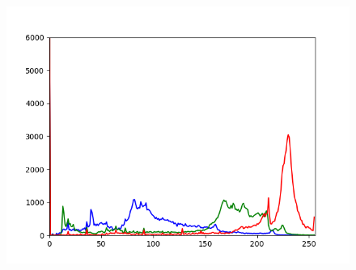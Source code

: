 \documentclass[a4paper,12pt,oneside]{article}
\begin{document}
\begin{figure}[htb]
\begin{minipage}[c]{0.08\textwidth}
\end{minipage}
\hfill
\begin{minipage}[c]{0.3\textwidth}
\includegraphics[width=\textwidth]{Sources/Bild2_HA_histo.png}
\end{minipage}
\end{figure}
\end{document}

